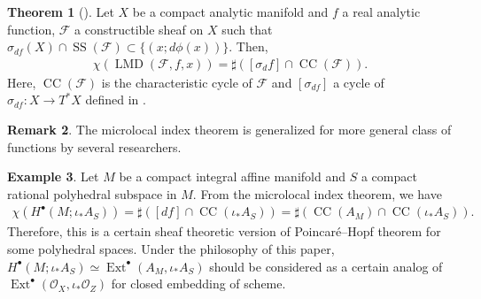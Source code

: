\documentclass[a4paper,dvipdfmx,reqno,12pt]{amsart}
\theoremstyle{definition}
\newtheorem{theorem}{Theorem}[section]
\newtheorem{definition}[theorem]{Definition}
\newtheorem{example}[theorem]{Example}
\newtheorem{remark}[theorem]{Remark}
\newcommand{\mcal}[1]{\mathcal{#1}}%
\newcommand{\opn}[1]{\operatorname{#1}}
\numberwithin{equation}{section}
\begin{document}
\begin{theorem}[{\cite[Theorem 9.5.6]{MR1299726}}]
Let $X$ be a compact analytic manifold and 
$f$ a real analytic function, $\mathcal{F}$ 
a constructible sheaf on $X$ such that 
$\sigma_{df}(X)\cap \opn{SS}(\mathcal{F})
\subset \{(x;d\phi(x))\}$.
Then, 
\begin{align}
\chi(\opn{LMD}(\mcal{F},f,x))
=\sharp ([\sigma_df]\cap \opn{CC}(\mcal{F})).
\end{align}
Here, $\opn{CC}(\mcal{F})$ is the characteristic cycle of 
$\mathcal{F}$ and $[\sigma_{df}]$ a cycle of 
$\sigma_{df}\colon X\to T^{*}X$ defined in 
\cite[Definition 9.3.5]{MR1299726}.
\end{theorem}

\begin{remark}
The microlocal index theorem is generalized for more general 
class of functions by several researchers.
\end{remark}

\begin{example}
Let $M$ be a compact integral affine manifold and $S$  
a compact rational polyhedral subspace in $M$. 
From the microlocal index theorem, we have
\begin{align}
\chi(H^{\bullet}(M;\iota_*A_S))
=\sharp ([df]\cap \opn{CC}(\iota_* A_S))
=\sharp (\opn{CC}(A_M)\cap \opn{CC}(\iota_* A_S)).
\end{align}
Therefore, this is a certain sheaf theoretic version of 
Poincar\'e--Hopf theorem for some polyhedral spaces. Under
the philosophy of this paper, $H^{\bullet}(M;\iota_*A_S)\simeq 
\opn{Ext}^{\bullet}(A_M,\iota_*A_S)$
 should be considered as a
certain analog of 
$\opn{Ext}^{\bullet}(\mcal{O}_X,\iota_*\mcal{O}_Z)$ for closed embedding of 
scheme.
\end{example}














\end{document}
